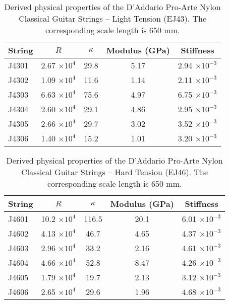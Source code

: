 \begin{table}%
  \centering
  \caption{\label{tbl:ej43_props} Derived physical properties of the D'Addario Pro-Arte Nylon Classical Guitar Strings -- Light Tension (EJ43). The corresponding scale length is 650 mm.}
    \begin{tabular}{lcccc}
    \hline \hline
    String  & $R$ & $\kappa$ & Modulus (GPa) & Stiffness \\
    \hline
    J4301 & 2.67 $\times 10^{4}$ & 29.8 & 5.17 & 2.94 $\times 10^{-3}$ \\
    J4302 & 1.09 $\times 10^{4}$ & 11.6 & 1.14 & 2.11 $\times 10^{-3}$ \\
    J4303 & 6.63 $\times 10^{4}$ & 75.6 & 4.97 & 6.75 $\times 10^{-3}$ \\
    J4304 & 2.60 $\times 10^{4}$ & 29.1 & 4.86 & 2.95 $\times 10^{-3}$ \\
    J4305 & 2.66 $\times 10^{4}$ & 29.7 & 3.02 & 3.52 $\times 10^{-3}$ \\
    J4306 & 1.40 $\times 10^{4}$ & 15.2 & 1.01 & 3.20 $\times 10^{-3}$ \\
    \hline
    \end{tabular}%
  \label{tab:addlabel}%
\end{table}%

\begin{table}%
  \centering
  \caption{\label{tbl:ej46_props} Derived physical properties of the D'Addario Pro-Arte Nylon Classical Guitar Strings -- Hard Tension (EJ46). The corresponding scale length is 650 mm.}
    \begin{tabular}{lcccc}
    \hline \hline
    String  & $R$ & $\kappa$ & Modulus (GPa) & Stiffness \\
    \hline
    J4601 & 10.2 $\times 10^{4}$ & 116.5 & 20.1 & 6.01 $\times 10^{-3}$ \\
    J4602 & 4.13 $\times 10^{4}$ & 46.7 & 4.65 & 4.37 $\times 10^{-3}$ \\
    J4603 & 2.96 $\times 10^{4}$ & 33.2 & 2.16 & 4.61 $\times 10^{-3}$ \\
    J4604 & 4.66 $\times 10^{4}$ & 52.8 & 8.47 & 4.26 $\times 10^{-3}$ \\
    J4605 & 1.79 $\times 10^{4}$ & 19.7 & 2.13 & 3.12 $\times 10^{-3}$ \\
    J4606 & 2.65 $\times 10^{4}$ & 29.6 & 1.96 & 4.68 $\times 10^{-3}$ \\
    \hline
    \end{tabular}%
  \label{tab:addlabel}%
\end{table}%

